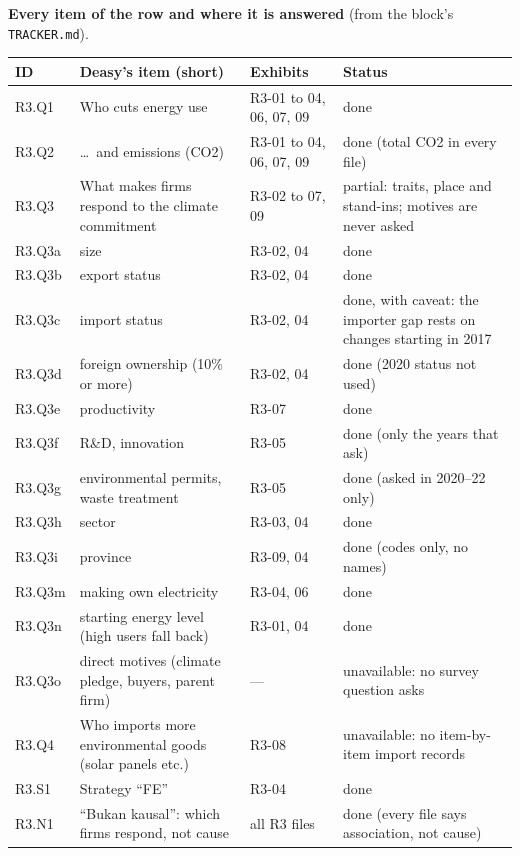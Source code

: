 {\small\textbf{Every item of the row and where it is answered} (from the block's \texttt{TRACKER.md}).}\par\smallskip
{\footnotesize
\begin{tabularx}{\linewidth}{@{}>{\raggedright\arraybackslash}p{1.05cm}X>{\raggedright\arraybackslash}p{3.1cm}>{\raggedright\arraybackslash}p{6.3cm}@{}}
\toprule
ID & Deasy's item (short) & Exhibits & Status \\
\midrule
R3.Q1 & Who cuts energy use & R3-01 to 04, 06, 07, 09 & done \\
R3.Q2 & \ldots\ and emissions (CO2) & R3-01 to 04, 06, 07, 09 & done (total CO2 in every file) \\
R3.Q3 & What makes firms respond to the climate commitment & R3-02 to 07, 09 & partial: traits, place and stand-ins; motives are never asked \\
R3.Q3a & \quad size & R3-02, 04 & done \\
R3.Q3b & \quad export status & R3-02, 04 & done \\
R3.Q3c & \quad import status & R3-02, 04 & done, with caveat: the importer gap rests on changes starting in 2017 \\
R3.Q3d & \quad foreign ownership (10\% or more) & R3-02, 04 & done (2020 status not used) \\
R3.Q3e & \quad productivity & R3-07 & done \\
R3.Q3f & \quad R\&D, innovation & R3-05 & done (only the years that ask) \\
R3.Q3g & \quad environmental permits, waste treatment & R3-05 & done (asked in 2020--22 only) \\
R3.Q3h & \quad sector & R3-03, 04 & done \\
R3.Q3i & \quad province & R3-09, 04 & done (codes only, no names) \\
R3.Q3m & \quad making own electricity & R3-04, 06 & done \\
R3.Q3n & \quad starting energy level (high users fall back) & R3-01, 04 & done \\
R3.Q3o & \quad direct motives (climate pledge, buyers, parent firm) & --- & unavailable: no survey question asks \\
R3.Q4 & Who imports more environmental goods (solar panels etc.) & R3-08 & unavailable: no item-by-item import records \\
R3.S1 & Strategy ``FE'' & R3-04 & done \\
R3.N1 & ``Bukan kausal'': which firms respond, not cause & all R3 files & done (every file says association, not cause) \\
\bottomrule
\end{tabularx}}


